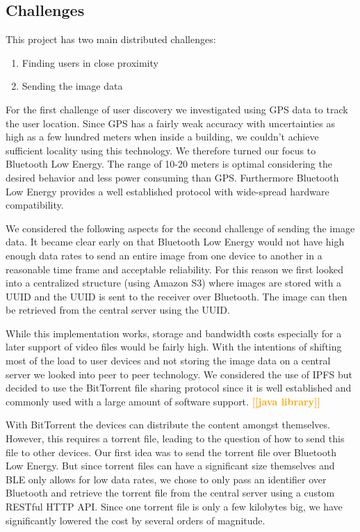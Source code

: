 \documentclass{report}
\newcommand{\todo}[1]{\textsf{\textbf{\textcolor{orange}{[[#1]]}}}}
\begin{document}
\subsection{Challenges}
This project has two main distributed challenges:
\begin{enumerate} 
    \item Finding users in close proximity
    \item Sending the image data
\end{enumerate}

For the first challenge of user discovery we investigated using GPS data to track the user location. Since GPS has a fairly weak accuracy with uncertainties as high as a few hundred meters when inside a building, we couldn't achieve sufficient locality using this technology. We therefore turned our focus to Bluetooth Low Energy. The range of 10-20 meters is optimal considering the desired behavior and less power consuming than GPS. Furthermore Bluetooth Low Energy provides a well established protocol with wide-spread hardware compatibility.

We considered the following aspects for the second challenge of sending the image data.
It became clear early on that Bluetooth Low Energy would not have high enough data rates to send an entire image from one device to another in a reasonable time frame and acceptable reliability. For this reason we first looked into a centralized structure (using Amazon S3) where images are stored with a UUID and the UUID is sent to the receiver over Bluetooth. The image can then be retrieved from the central server using the UUID.

While this implementation works, storage and bandwidth costs especially for a later support of video files would be fairly high. With the intentions of shifting most of the load to user devices and not storing the image data on a central server we looked into peer to peer technology. We considered the use of IPFS but decided to use the BitTorrent file sharing protocol since it is well established and commonly used with a large amount of software support. \todo{java library} 

With BitTorrent the devices can distribute the content amongst themselves. However, this requires a torrent file, leading to the question of how to send this file to other devices. Our first idea was to send the torrent file over Bluetooth Low Energy. But since torrent files can have a significant size themselves and BLE only allows for low data rates, we chose to only pass an identifier over Bluetooth and retrieve the torrent file from the central server  using a custom RESTful HTTP API. Since one torrent file is only a few kilobytes big, we have significantly lowered the cost by several orders of magnitude.
\end{document}
